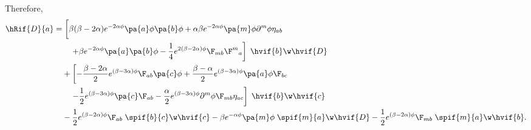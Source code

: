 Therefore,
\begin{align}
  \hRif{D}{a} =& \left.\bigg[\beta(\beta-2\alpha)e^{-2\alpha\phi}\pa{a}\phi\pa{b}\phi + \alpha\beta e^{-2\alpha\phi}\pa{m}\phi\partial^{m}\phi \eta_{a b} \right.\notag\\
    &\quad\left.+ \beta e^{-2\alpha\phi}\pa{a}\pa{b}\phi -\frac{1}{4}e^{2(\beta-2\alpha)\phi}\F_{m b}\F^m{}_a\right]\;\hvif{b}\w\hvif{D}\nonumber\\
 & + \left[-\frac{\beta-2\alpha}{2}e^{(\beta-3\alpha)\phi}\F_{ab}\pa{c}\phi +\frac{\beta-\alpha}{2}e^{(\beta-3\alpha)\phi}\pa{a}\phi \F_{bc}\right.\notag\\
    &\quad\left. - \frac{1}{2}e^{(\beta-3\alpha)\phi}\pa{c} \F_{ab} - \frac{\alpha}{2}e^{(\beta-3\alpha)\phi}\partial^{m}\phi\F_{m b} \eta_{a c}
\right]\;\hvif{b}\w\hvif{c}\nonumber\\
  &  %
- \frac{1}{2}e^{(\beta-2\alpha)\phi}\F_{ab}\; \spif{b}{c}\w\hvif{c} - \beta e^{-\alpha\phi}\pa{m}\phi\;\spif{m}{a}\w\hvif{D} - \frac{1}{2}e^{(\beta-2\alpha)\phi}\F_{m b}\;\spif{m}{a}\w\hvif{b}.
\end{align}


